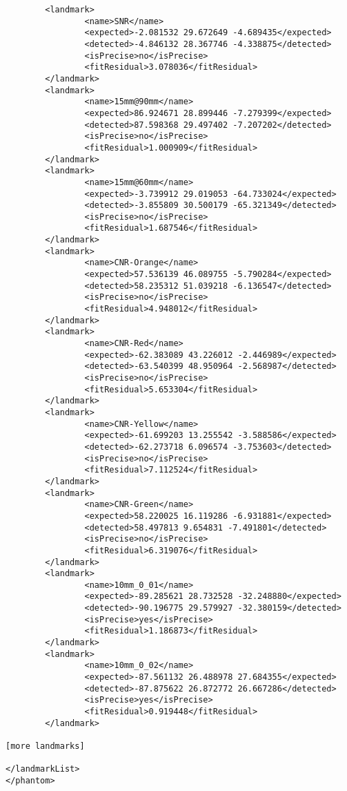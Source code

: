 \documentclass{InsightArticle}
\begin{document}
\begin{verbatim}
        <landmark>
                <name>SNR</name>
                <expected>-2.081532 29.672649 -4.689435</expected>
                <detected>-4.846132 28.367746 -4.338875</detected>
                <isPrecise>no</isPrecise>
                <fitResidual>3.078036</fitResidual>
        </landmark>
        <landmark>
                <name>15mm@90mm</name>
                <expected>86.924671 28.899446 -7.279399</expected>
                <detected>87.598368 29.497402 -7.207202</detected>
                <isPrecise>no</isPrecise>
                <fitResidual>1.000909</fitResidual>
        </landmark>
        <landmark>
                <name>15mm@60mm</name>
                <expected>-3.739912 29.019053 -64.733024</expected>
                <detected>-3.855809 30.500179 -65.321349</detected>
                <isPrecise>no</isPrecise>
                <fitResidual>1.687546</fitResidual>
        </landmark>
        <landmark>
                <name>CNR-Orange</name>
                <expected>57.536139 46.089755 -5.790284</expected>
                <detected>58.235312 51.039218 -6.136547</detected>
                <isPrecise>no</isPrecise>
                <fitResidual>4.948012</fitResidual>
        </landmark>
        <landmark>
                <name>CNR-Red</name>
                <expected>-62.383089 43.226012 -2.446989</expected>
                <detected>-63.540399 48.950964 -2.568987</detected>
                <isPrecise>no</isPrecise>
                <fitResidual>5.653304</fitResidual>
        </landmark>
        <landmark>
                <name>CNR-Yellow</name>
                <expected>-61.699203 13.255542 -3.588586</expected>
                <detected>-62.273718 6.096574 -3.753603</detected>
                <isPrecise>no</isPrecise>
                <fitResidual>7.112524</fitResidual>
        </landmark>
        <landmark>
                <name>CNR-Green</name>
                <expected>58.220025 16.119286 -6.931881</expected>
                <detected>58.497813 9.654831 -7.491801</detected>
                <isPrecise>no</isPrecise>
                <fitResidual>6.319076</fitResidual>
        </landmark>
        <landmark>
                <name>10mm_0_01</name>
                <expected>-89.285621 28.732528 -32.248880</expected>
                <detected>-90.196775 29.579927 -32.380159</detected>
                <isPrecise>yes</isPrecise>
                <fitResidual>1.186873</fitResidual>
        </landmark>
        <landmark>
                <name>10mm_0_02</name>
                <expected>-87.561132 26.488978 27.684355</expected>
                <detected>-87.875622 26.872772 26.667286</detected>
                <isPrecise>yes</isPrecise>
                <fitResidual>0.919448</fitResidual>
        </landmark>

[more landmarks]

</landmarkList>
</phantom>
\end{verbatim}
\end{document}
